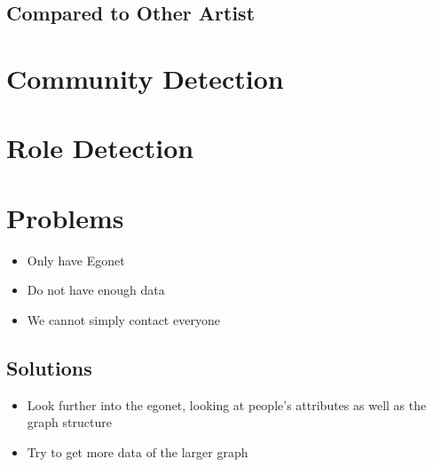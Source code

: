 \documentclass[11pt]{article}
\begin{document}
\subsection*{Compared to Other Artist}
\label{sec:org77ba0f0}
\section*{Community Detection}
\label{sec:orgb53a031}
\section*{Role Detection}
\label{sec:orgbe3f63f}
\section*{Problems}
\label{sec:orgbc4c822}
\begin{itemize}
\item Only have Egonet
\item Do not have enough data
\item We cannot simply contact everyone
\end{itemize}

\subsection*{Solutions}
\label{sec:org524f2d0}
\begin{itemize}
\item Look further into the egonet, looking at people's attributes as well as the graph structure
\item Try to get more data of the larger graph
\end{itemize}
\end{document}
